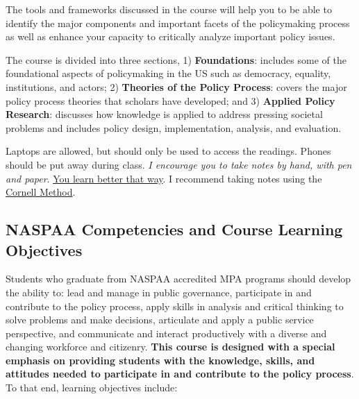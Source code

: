 \vspace{0.1in}

\noindent The tools and frameworks discussed in the course will help you
to be able to identify the major components and important facets of the
policymaking process as well as enhance your capacity to critically
analyze important policy issues.

\vspace{0.1in}

\noindent The course is divided into three sections, 1)
\textbf{Foundations}: includes some of the foundational aspects of
policymaking in the US such as democracy, equality, institutions, and
actors; 2) \textbf{Theories of the Policy Process}: covers the major
policy process theories that scholars have developed; and 3)
\textbf{Applied Policy Research}: discusses how knowledge is applied to
address pressing societal problems and includes policy design,
implementation, analysis, and evaluation.

\vspace{0.1in}

\noindent Laptops are allowed, but should only be used to access the
readings. Phones should be put away during class. \emph{I encourage you
to take notes by hand, with pen and paper}.
\href{https://www.nytimes.com/2017/11/27/learning/should-teachers-and-professors-ban-student-use-of-laptops-in-class.html}{You
learn better that way}. I recommend taking notes using the
\href{http://www.usu.edu/arc/idea_sheets/pdf/note_taking_cornell.pdf}{Cornell
Method}.

\hypertarget{naspaa-competencies-and-course-learning-objectives}{%
\subsection{NASPAA Competencies and Course Learning
Objectives}\label{naspaa-competencies-and-course-learning-objectives}}

Students who graduate from NASPAA accredited MPA programs should develop
the ability to: lead and manage in public governance, participate in and
contribute to the policy process, apply skills in analysis and critical
thinking to solve problems and make decisions, articulate and apply a
public service perspective, and communicate and interact productively
with a diverse and changing workforce and citizenry. \textbf{This course
is designed with a special emphasis on providing students with the
knowledge, skills, and attitudes needed to participate in and contribute
to the policy process}. To that end, learning objectives include:

